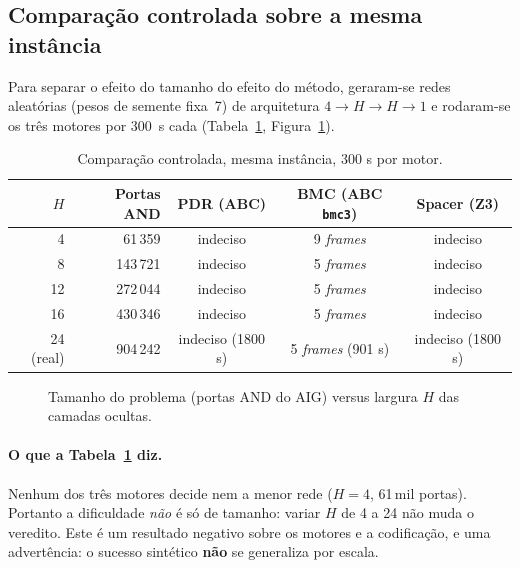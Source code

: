 \documentclass[12pt,openright,oneside,a4paper,chapter=TITLE,sumario=tradicional,english,brazil]{abntex2}
\begin{document}
\subsection{Comparação controlada sobre a mesma instância}

Para separar o efeito do tamanho do efeito do método, geraram-se redes aleatórias (pesos de semente fixa~7) de arquitetura $4{\to}H{\to}H{\to}1$ e rodaram-se os três motores por 300~s cada (Tabela~\ref{tab:escala}, Figura~\ref{fig:escala}).

\begin{table}[htb]
\caption{Comparação controlada, mesma instância, 300 s por motor.}\label{tab:escala}
\centering
\begin{tabular}{r|r|c|c|c}
\toprule
$H$ & Portas AND & PDR (ABC) & BMC (ABC \texttt{bmc3}) & Spacer (Z3) \\
\midrule
 4 &  61\,359 & indeciso & 9 \emph{frames} & indeciso \\
 8 & 143\,721 & indeciso & 5 \emph{frames} & indeciso \\
12 & 272\,044 & indeciso & 5 \emph{frames} & indeciso \\
16 & 430\,346 & indeciso & 5 \emph{frames} & indeciso \\
24 (real) & 904\,242 & indeciso (1800 s) & 5 \emph{frames} (901 s) & indeciso (1800 s) \\
\bottomrule
\end{tabular}
\end{table}

\begin{figure}[htb]
  \caption{Tamanho do problema (portas AND do AIG) versus largura $H$ das camadas ocultas.}\label{fig:escala}
  \centering
\end{figure}

\paragraph{O que a Tabela~\ref{tab:escala} diz.} Nenhum dos três motores decide nem a menor rede ($H{=}4$, 61\,mil portas). Portanto a dificuldade \emph{não} é só de tamanho: variar $H$ de 4 a 24 não muda o veredito. Este é um resultado negativo sobre os motores e a codificação, e uma advertência: o sucesso sintético \textbf{não} se generaliza por escala.
\end{document}
